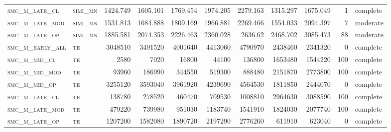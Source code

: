 \begin{landscape}
\begin{center}
\begin{footnotesize}
\begin{longtable}{llrrrrr|rrr}
\textsc{smc\_m\_late\_cl  } & \textsc{simi\_mn  }   & 1424.749 & 1605.101 & 1769.454 & 1974.205 & 2279.163 & 1315.297    & 1675.049      & 1             & complete \\
\textsc{smc\_m\_late\_mod } & \textsc{simi\_mn  }   & 1531.813 & 1684.888 & 1809.169 & 1966.881 & 2269.466 & 1554.033    & 2094.397      & 7             & moderate \\
\textsc{smc\_m\_late\_op  } & \textsc{simi\_mn  }   & 1885.581 & 2074.353 & 2226.463 & 2360.028 & 2636.62  & 2468.702    & 3085.473      & 88            & moderate \\
\textsc{smc\_m\_early\_all} & \textsc{te  	    }   & 3048510  & 3491520  & 4001640  & 4413060  & 4790970  & 2438460     & 2341320       & 0             & complete     \\
\textsc{smc\_m\_mid\_cl   } & \textsc{te        }   & 2580     & 7020     & 16800    & 44100    & 136800   & 1653480     & 1544220       & 100           & complete \\
\textsc{smc\_m\_mid\_mod  } & \textsc{te        }   & 93960    & 186990   & 344550   & 519300   & 888480   & 2151870     & 2773800       & 100           & complete \\
\textsc{smc\_m\_mid\_op   } & \textsc{te        }   & 3255120  & 3593040  & 3961920  & 4239690  & 4564530  & 1811850     & 2444070       & 0             & complete     \\
\textsc{smc\_m\_late\_cl  } & \textsc{te        }   & 138780   & 278520   & 460470   & 709530   & 1008810  & 2964630     & 3088590       & 100           & complete \\
\textsc{smc\_m\_late\_mod } & \textsc{te        }   & 479220   & 739980   & 951030   & 1183740  & 1541910  & 1824030     & 2077740       & 100           & complete \\
\textsc{smc\_m\_late\_op  } & \textsc{te        }   & 1207200  & 1582080  & 1890720  & 2197290  & 2776260  & 611910      & 623040        & 0             & complete    

\end{longtable}
\end{footnotesize}
\end{center}
\end{landscape}

\restoregeometry
\pagestyle{headings}



